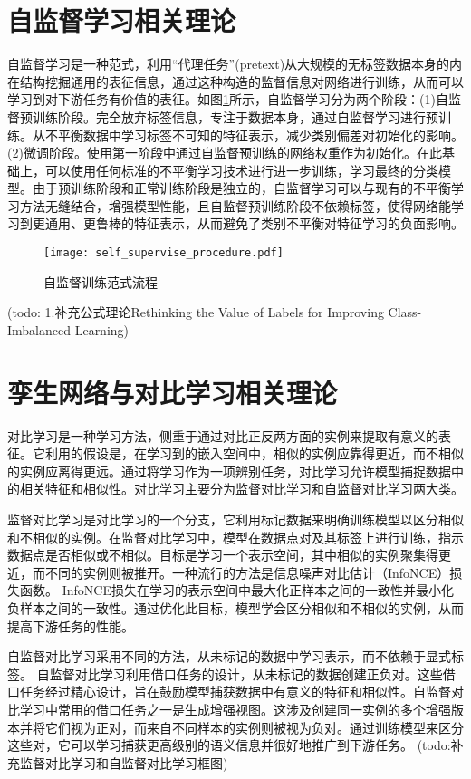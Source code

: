 \documentclass[master]{thesis-uestc}
\begin{document}
\section{自监督学习相关理论}
自监督学习是一种范式，利用“代理任务”(pretext)从大规模的无标签数据本身的内在结构挖掘通用的表征信息，通过这种构造的监督信息对网络进行训练，从而可以学习到对下游任务有价值的表征。如图\ref{self_supervise_procedure}所示，自监督学习分为两个阶段：(1)自监督预训练阶段。完全放弃标签信息，专注于数据本身，通过自监督学习进行预训练。从不平衡数据中学习标签不可知的特征表示，减少类别偏差对初始化的影响。(2)微调阶段。使用第一阶段中通过自监督预训练的网络权重作为初始化。在此基础上，可以使用任何标准的不平衡学习技术进行进一步训练，学习最终的分类模型。由于预训练阶段和正常训练阶段是独立的，自监督学习可以与现有的不平衡学习方法无缝结合，增强模型性能，且自监督预训练阶段不依赖标签，使得网络能学习到更通用、更鲁棒的特征表示，从而避免了类别不平衡对特征学习的负面影响。
\begin{figure}[h]
    \texttt{[image: self\_supervise\_procedure.pdf]}
    \caption{自监督训练范式流程}
    \label{self_supervise_procedure}
\end{figure}

(todo: 1.补充公式理论Rethinking the Value of Labels for Improving Class-Imbalanced Learning)
\section{孪生网络与对比学习相关理论}
对比学习是一种学习方法，侧重于通过对比正反两方面的实例来提取有意义的表征。它利用的假设是，在学习到的嵌入空间中，相似的实例应靠得更近，而不相似的实例应离得更远。通过将学习作为一项辨别任务，对比学习允许模型捕捉数据中的相关特征和相似性。对比学习主要分为监督对比学习和自监督对比学习两大类。

监督对比学习是对比学习的一个分支，它利用标记数据来明确训练模型以区分相似和不相似的实例。在监督对比学习中，模型在数据点对及其标签上进行训练，指示数据点是否相似或不相似。目标是学习一个表示空间，其中相似的实例聚集得更近，而不同的实例则被推开。一种流行的方法是信息噪声对比估计（InfoNCE）损失函数。 InfoNCE损失在学习的表示空间中最大化正样本之间的一致性并最小化负样本之间的一致性。通过优化此目标，模型学会区分相似和不相似的实例，从而提高下游任务的性能。

自监督对比学习采用不同的方法，从未标记的数据中学习表示，而不依赖于显式标签。 自监督对比学习利用借口任务的设计，从未标记的数据创建正负对。这些借口任务经过精心设计，旨在鼓励模型捕获数据中有意义的特征和相似性。自监督对比学习中常用的借口任务之一是生成增强视图。这涉及创建同一实例的多个增强版本并将它们视为正对，而来自不同样本的实例则被视为负对。通过训练模型来区分这些对，它可以学习捕获更高级别的语义信息并很好地推广到下游任务。
(todo:补充监督对比学习和自监督对比学习框图)
\end{document}
